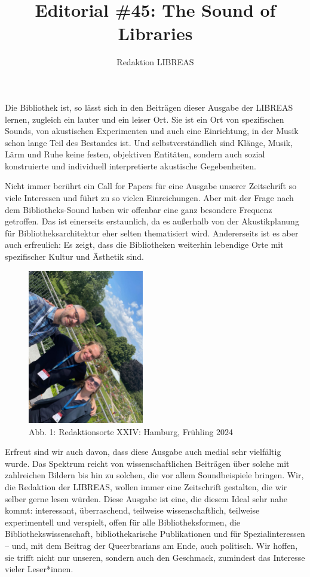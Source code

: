 \documentclass[a4paper,
fontsize=11pt,
oneside,
numbers=noperiodatend,
parskip=half-,
bibliography=totoc,
final
]{scrartcl}
\title{\LARGE{Editorial \#45: The Sound of Libraries}}%
\author{Redaktion LIBREAS} %
\date{}
\begin{document}
\maketitle
\thispagestyle{fancyplain} 


Die Bibliothek ist, so lässt sich in den Beiträgen dieser Ausgabe der
LIBREAS lernen, zugleich ein lauter und ein leiser Ort. Sie ist ein Ort
von spezifischen Sounds, von akustischen Experimenten und auch eine
Einrichtung, in der Musik schon lange Teil des Bestandes ist. Und
selbstverständlich sind Klänge, Musik, Lärm und Ruhe keine festen,
objektiven Entitäten, sondern auch sozial konstruierte und individuell
interpretierte akustische Gegebenheiten.

Nicht immer berührt ein Call for Papers für eine Ausgabe unserer
Zeitschrift so viele Interessen und führt zu so vielen Einreichungen.
Aber mit der Frage nach dem Bibliotheks-Sound haben wir offenbar eine
ganz besondere Frequenz getroffen. Das ist einerseits erstaunlich, da es
außerhalb von der Akustikplanung für Bibliotheksarchitektur eher selten
thematisiert wird. Andererseits ist es aber auch erfreulich: Es zeigt,
dass die Bibliotheken weiterhin lebendige Orte mit spezifischer Kultur
und Ästhetik sind.

\begin{figure}[h!]
\centering
\includegraphics[width=0.45\textwidth]{image.jpg}
\caption{Abb. 1: Redaktionsorte XXIV: Hamburg, Frühling 2024}
\end{figure}

Erfreut sind wir auch davon, dass diese Ausgabe auch medial sehr
vielfältig wurde. Das Spektrum reicht von wissenschaftlichen Beiträgen
über solche mit zahlreichen Bildern bis hin zu solchen, die vor allem
Soundbeispiele bringen. Wir, die Redaktion der LIBREAS, wollen immer
eine Zeitschrift gestalten, die wir selber gerne lesen würden. Diese
Ausgabe ist eine, die diesem Ideal sehr nahe kommt: interessant,
überraschend, teilweise wissenschaftlich, teilweise experimentell und
verspielt, offen für alle Bibliotheksformen, die
Bibliothekswissenschaft, bibliothekarische Publikationen und für
Spezialinteressen -- und, mit dem Beitrag der Queerbrarians am Ende,
auch politisch. Wir hoffen, sie trifft nicht nur unseren, sondern auch
den Geschmack, zumindest das Interesse vieler Leser*innen.
\end{document}

